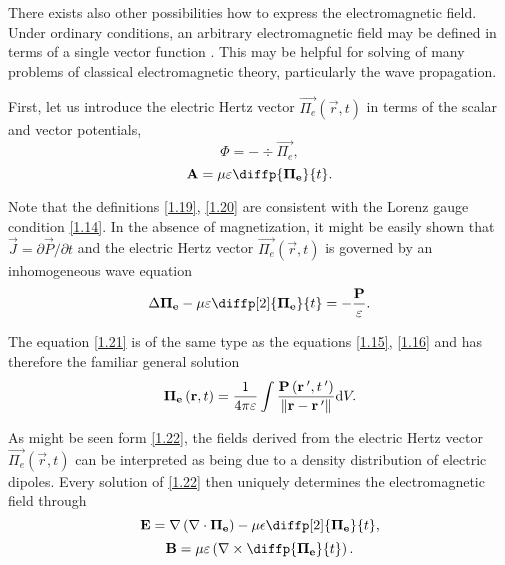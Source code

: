 There exists also other possibilities how to express the electromagnetic field. Under ordinary conditions, an arbitrary electromagnetic field may be defined in terms of a single vector function \cite{Essex1977}. This may be helpful for solving of many problems of classical electromagnetic theory, particularly the wave propagation.

First, let us introduce the electric Hertz vector $ {\vec{\Pi_e}}\left(\vec{r}, t \right) $ in terms of the scalar and vector potentials,
\begin{equation}
\label{1.19}
\Phi = - \div{\vec{\Pi_e}},
\end{equation}
\begin{equation}
\label{1.20}
\vec{A} = \mu \varepsilon \diffp{\vec{\Pi_e}}{t}.
\end{equation}

Note that the definitions \ref{1.19}, \ref{1.20} are consistent with the Lorenz gauge condition \ref{1.14}. In the absence of magnetization, it might be easily shown that $ \vec{J} = \partial{\vec{P}}/\partial{t} $ and the electric Hertz vector $ {\vec{\Pi_e}}\left(\vec{r}, t \right) $ is governed by an inhomogeneous wave equation
\begin{equation}
\label{1.21}
\laplace{\vec{\Pi_e}} - \mu \varepsilon \diffp[2]{\vec{\Pi_e}}{t} = -\frac{\vec{P}}{\varepsilon}.
\end{equation}

The equation \ref{1.21} is of the same type as the equations \ref{1.15}, \ref{1.16} and has therefore the familiar general solution 
\begin{equation}
\label{1.22}
\mathbf{\Pi_e}\left(\mathbf{r}, t \right) = \frac{1}{4 \pi \varepsilon} \int \frac{\mathbf{P}\left(\mathbf{r^{\: \prime}}, t^{\: \prime} \right)}{\lVert\mathbf{r} - \mathbf{r^{\: \prime}}\rVert} \mathrm{d} V.
\end{equation}

As might be seen form \ref{1.22}, the fields derived from the electric Hertz vector $ {\vec{\Pi_e}}\left(\vec{r}, t \right) $ can be interpreted as being due to a density distribution of electric dipoles. Every solution of \ref{1.22} then uniquely determines the electromagnetic field through
\begin{equation}
\label{1.23}
\vec{E} = \grad{\left(\div{\vec{\Pi_e}}\right)} - \mu \epsilon \diffp[2]{\vec{\Pi_e}}{t},
\end{equation}
\begin{equation}
\label{1.24}
\vec{B} = \mu \varepsilon \left(\rot{\diffp{\vec{\Pi_e}}{t}}\right).
\end{equation}

